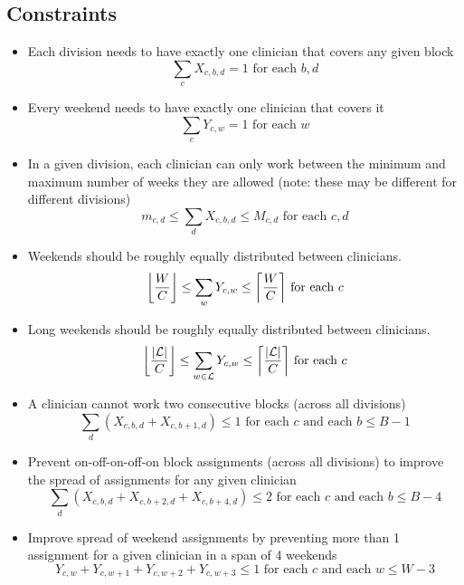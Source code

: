 \documentclass[]{article}
\newcommand{\mc}{\mathcal}
\DeclarePairedDelimiter{\floor}{\lfloor}{\rfloor}
\DeclarePairedDelimiter{\ceil}{\lceil}{\rceil}
\begin{document}
\subsection{Constraints} \label{constraints}
	\begin{itemize}
		\item Each division needs to have exactly one clinician that covers any given block
			\begin{equation}
				\sum_{c} X_{c, b, d} = 1 \text{ for each } b, d
			\end{equation}
		\item Every weekend needs to have exactly one clinician that covers it
			\begin{equation}
				\sum_{c} Y_{c, w} = 1 \text{ for each } w
			\end{equation}
		\item In a given division, each clinician can only work between the minimum and maximum number of weeks they are allowed (note: these may be different for different divisions)
			\begin{equation}
				m_{c, d} \leq \sum_{d} X_{c, b, d} \leq M_{c, d} \text{ for each } c, d
			\end{equation}
		\item Weekends should be roughly equally distributed between clinicians.
			\begin{equation}
				\floor*{ \frac{W}{C} } \leq \sum_{w} Y_{c, w} \leq \ceil*{ \frac{W}{C} } \text{ for each } c
			\end{equation}
		\item Long weekends should be roughly equally distributed between clinicians.
			\begin{equation}
				\floor*{\frac{|\mc{L}|}{C}} \leq \sum_{w \in \mc{L}} Y_{c, w} \leq \ceil*{\frac{|\mc{L}|}{C}} \text{ for each } c
			\end{equation}
		\item A clinician cannot work two consecutive blocks (across all divisions)
			\begin{equation}
				\sum_d \left(X_{c, b, d} + X_{c, b+1, d}\right) \leq 1 \text{ for each $c$ and each $b \leq B - 1$}
			\end{equation}
		\item Prevent on-off-on-off-on block assignments (across all divisions) to improve the spread of assignments for any given clinician
			\begin{equation}
				\sum_d \left(X_{c, b, d} + X_{c, b + 2, d} + X_{c, b + 4, d}\right) \leq 2 \text{ for each $c$ and each $b \leq B - 4$}
			\end{equation}
		\item Improve spread of weekend assignments by preventing more than 1 assignment for a given clinician in a span of 4 weekends
			\begin{equation}
				Y_{c, w} + Y_{c, w+1} + Y_{c, w+2} + Y_{c, w+3} \leq 1 \text{ for each $c$ and each $w \leq W - 3$}
			\end{equation}
	\end{itemize}
\end{document}
